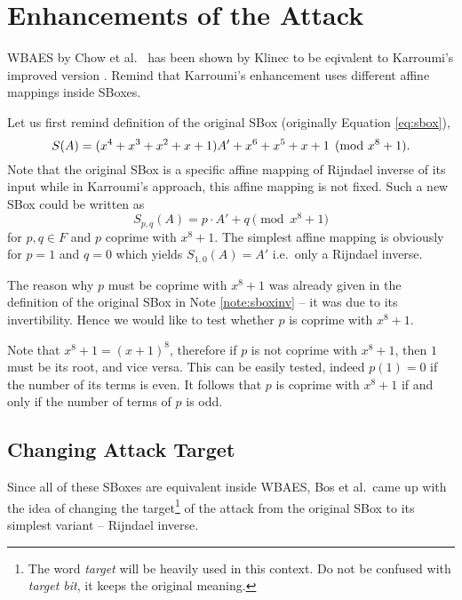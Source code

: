 \section{Enhancements of the Attack}   %

WBAES by Chow et al.\ \cite{chow2003aes} has been shown by Klinec \cite{klinec2013white} to be eqivalent to Karroumi's improved version \cite{karroumi2011protecting}. Remind that Karroumi's enhancement uses different affine mappings inside SBoxes. %

Let us first remind definition of the original SBox (originally Equation \ref{eq:sbox}),
\[
	S(A) = (x^4 + x^3 + x^2 + x + 1)A' + x^6 + x^5 + x + 1 \pmod{x^8+1} .
\]
Note that the original SBox is a specific affine mapping of Rijndael inverse of its input while in Karroumi's approach, this affine mapping is not fixed. Such a new SBox could be written as
\begin{equation}
	S_{p,q}(A) = p\cdot A' + q \pmod{x^8+1}
\end{equation}
for $p,q\in F$ and $p$ coprime with $x^8+1$. The simplest affine mapping is obviously for $p=1$ and $q=0$ which yields $S_{1,0}(A) = A'$ i.e.\ only a Rijndael inverse.

\begin{remark}
\label{rem:coprime}
	The reason why $p$ must be coprime with $x^8+1$ was already given in the definition of the original SBox in Note \ref{note:sboxinv} -- it was due to its invertibility. Hence we would like to test whether $p$ is coprime with $x^8+1$.
	
	Note that $x^8+1 = (x+1)^8$, therefore if $p$ is not coprime with $x^8+1$, then $1$ must be its root, and vice versa. This can be easily tested, indeed $p(1) = 0$ if the number of its terms is even. It follows that $p$ is coprime with $x^8+1$ if and only if the number of terms of $p$ is odd.
\end{remark}



\subsection{Changing Attack Target}

Since all of these SBoxes are equivalent inside WBAES, Bos et al.\ came up with the idea of changing the target\footnote{The word {\em target} will be heavily used in this context. Do not be confused with {\em target bit}, it keeps the original meaning.} of the attack from the original SBox to its simplest variant -- Rijndael inverse.

